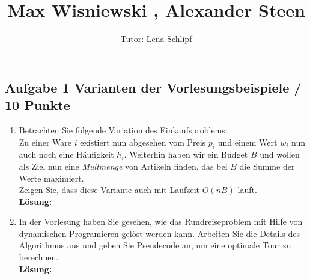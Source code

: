 \documentclass[11pt,a4paper,ngerman]{article}
\author{Tutor: Lena Schlipf}
\date{}
\title{Max Wisniewski , Alexander Steen}
\begin{document}

\maketitle
\thispagestyle{fancy}


\subsection*{Aufgabe 1 \mdseries Varianten der Vorlesungsbeispiele \mbox{} \hfill \underline \quad \; / 10 Punkte}

\begin{enumerate}[\bfseries (a)]



\item Betrachten Sie folgende Variation des Einkaufsproblems:\\
Zu einer Ware $i$ existiert nun abgesehen vom Preis $p_i$ und einem Wert $w_i$ nun auch noch eine Häufigkeit $h_i$. Weiterhin haben wir ein Budget $B$ und wollen als Ziel nun eine \emph{Multmenge} von Artikeln finden, das bei $B$ die Summe der Werte maximiert.\\
Zeigen Sie, dass diese Variante auch mit Laufzeit $O(nB)$ läuft.\\

\textbf{Lösung:}



\item In der Vorlesung haben Sie gesehen, wie das Rundreiseproblem mit Hilfe von dynamischen Programieren gelöst werden kann. Arbeiten Sie die Details des Algorithmus aus und geben Sie Pseudecode an, um eine optimale Tour zu berechnen.\\

\textbf{Lösung:}

\end{enumerate}


\end{document}

